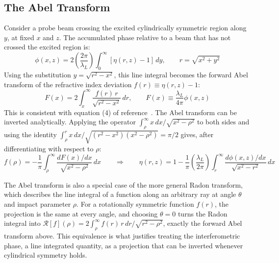 
\subsection{The Abel Transform}

Consider a probe beam crossing the excited cylindrically symmetric region along $y$, at fixed $x$ and $z$. The accumulated phase relative to a beam that has not crossed the excited region is:
\begin{equation}
\phi(x,z) = 2\left(\frac{2\pi}{\lambda_L}\right)\int_0^{\infty}[\eta(r,z) - 1] \, dy, \qquad r = \sqrt{x^2+y^2}
\end{equation}
Using the substitution $y = \sqrt{r^2 - x^2}$, this line integral becomes the forward Abel transform of the refractive index deviation $f(r) \equiv \eta(r,z)-1$:
\begin{equation}
\boxed{F(x) = 2\int_x^{\infty} \frac{f(r) \, r}{\sqrt{r^2 - x^2}} \, dr}, \qquad F(x) \equiv \frac{\lambda_L}{4\pi}\phi(x,z)
\end{equation}
This is consistent with equation (4) of reference~\cite{gonzalez2012plasma}. The Abel transform can be inverted analytically. Applying the operator $\int_\rho^\infty x\,dx/\sqrt{x^2-\rho^2}$ to both sides and using the identity $\int_\rho^r x\,dx/\sqrt{(r^2-x^2)(x^2-\rho^2)} = \pi/2$ gives, after differentiating with respect to $\rho$:
\begin{equation}
\boxed{f(\rho) = -\frac{1}{\pi} \int_{\rho}^{\infty} \frac{dF(x)/dx}{\sqrt{x^2 - \rho^2}} \, dx}
\qquad\Longrightarrow\qquad
\boxed{\eta(r,z) = 1 - \frac{1}{\pi}\left(\frac{\lambda_L}{2\pi}\right)\int_r^{\infty} \frac{d\phi(x,z)/dx}{\sqrt{x^2 - r^2}} \, dx}
\end{equation}

The Abel transform is also a special case of the more general Radon transform, which describes the line integral of a function along an arbitrary ray at angle $\theta$ and impact parameter $\rho$. For a rotationally symmetric function $f(r)$, the projection is the same at every angle, and choosing $\theta=0$ turns the Radon integral into $\mathcal{R}[f](\rho) = 2\int_\rho^\infty f(r)\,r\,dr/\sqrt{r^2-\rho^2}$, exactly the forward Abel transform above. This equivalence is what justifies treating the interferometric phase, a line integrated quantity, as a projection that can be inverted whenever cylindrical symmetry holds.

